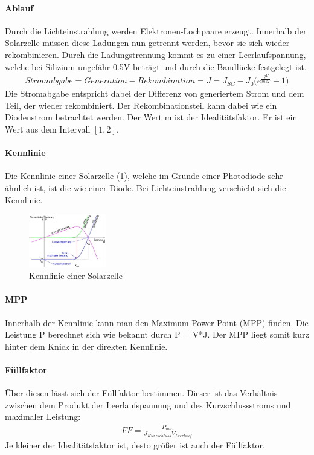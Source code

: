 		\paragraph{Ablauf}
		Durch die Lichteinstrahlung werden Elektronen-Lochpaare erzeugt. Innerhalb der Solarzelle müssen diese Ladungen nun getrennt werden, bevor sie sich wieder rekombinieren. Durch die Ladungstrennung kommt es zu einer Leerlaufspannung, welche bei Silizium ungefähr 0.5V beträgt und durch die Bandlücke festgelegt ist.  
		\begin{align}
			Stromabgabe = Generation - Rekombination = J = J_{SC} - J_0 \bigg(e^{\frac{qV}{mkT}}-1\bigg)
		\end{align}
		Die Stromabgabe entspricht dabei der Differenz von generiertem Strom und dem Teil, der wieder rekombiniert. Der Rekombinationsteil kann dabei wie ein Diodenstrom betrachtet werden. Der Wert m ist der Idealitätsfaktor. Er ist ein Wert aus dem Intervall $[1,2]$.

		\paragraph{Kennlinie} Die Kennlinie einer Solarzelle (\ref{9_kennlinie}), welche im Grunde einer Photodiode sehr ähnlich ist, ist die wie einer Diode. Bei Lichteinstrahlung verschiebt sich die Kennlinie.
		\begin{figure}[h]
			\centering
			\includegraphics[width=0.3\textwidth]{Kapitel/Kap09/kennlinie.png}
			\caption{Kennlinie einer Solarzelle}
			\label{9_kennlinie}
		\end{figure}
		
		\paragraph{MPP} Innerhalb der Kennlinie kann man den Maximum Power Point (MPP) finden. Die Leistung P berechnet sich wie bekannt durch P = V*J. Der MPP liegt somit kurz hinter dem Knick in der direkten Kennlinie. 
		
		\paragraph{Füllfaktor} Über diesen lässt sich der Füllfaktor bestimmen. Dieser ist das Verhältnis zwischen dem Produkt der Leerlaufspannung und des Kurzschlussstroms und maximaler Leistung:
		\begin{align}
			FF = \frac{P_{max}}{J_{Kurzschluss}V_{Leerlauf}}
		\end{align} 
		Je kleiner der Idealitätsfaktor ist, desto größer ist auch der Füllfaktor.

